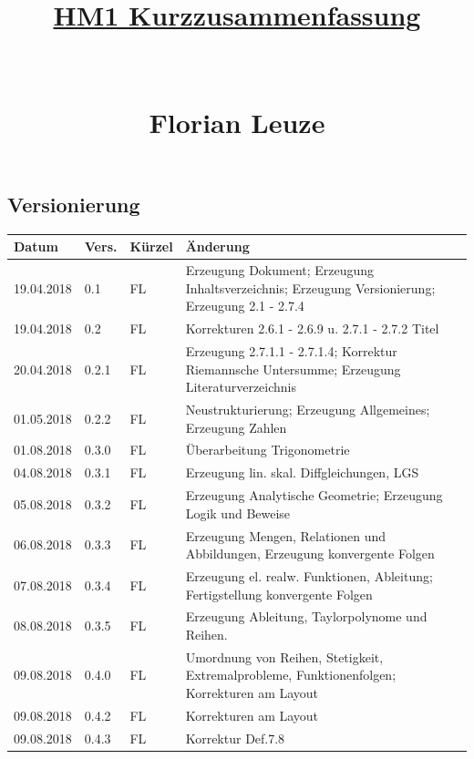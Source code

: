 \documentclass[12pt,a4paper]{article}%
\numberwithin{equation}{section}
\numberwithin{equation}{subsection}
\begin{document}


\author{}
\title{\underline{HM1 Kurzzusammenfassung} \\ $\;$ \\ $\;$ \\ Florian Leuze}
\date{}

\maketitle %
\newpage

\tableofcontents

  \subsection*{Versionierung}
  \begin{tabular}{|p{2cm}|p{1cm}|p{1.5cm}|p{8.5cm}|}\hline
    Datum & Vers. & Kürzel & Änderung \\ \hline
    19.04.2018 & 0.1 & FL & Erzeugung Dokument; Erzeugung Inhaltsverzeichnis; Erzeugung Versionierung; Erzeugung 2.1 - 2.7.4 \\ \hline
    19.04.2018 & 0.2 & FL & Korrekturen 2.6.1 - 2.6.9 u. 2.7.1 - 2.7.2 Titel\\ \hline
    20.04.2018 & 0.2.1 & FL & Erzeugung 2.7.1.1 - 2.7.1.4; Korrektur Riemannsche Untersumme; Erzeugung Literaturverzeichnis \\ \hline
    01.05.2018 & 0.2.2 & FL & Neustrukturierung; Erzeugung Allgemeines; Erzeugung Zahlen \\ \hline
    01.08.2018 & 0.3.0 & FL & Überarbeitung Trigonometrie \\ \hline
    04.08.2018 & 0.3.1 & FL & Erzeugung lin. skal. Diffgleichungen, LGS \\ \hline
    05.08.2018 & 0.3.2 & FL & Erzeugung Analytische Geometrie; Erzeugung Logik und Beweise \\ \hline
    06.08.2018 & 0.3.3 & FL & Erzeugung Mengen, Relationen und Abbildungen, Erzeugung konvergente Folgen \\ \hline
    07.08.2018 & 0.3.4 & FL & Erzeugung el. realw. Funktionen, Ableitung; Fertigstellung konvergente Folgen \\ \hline
    08.08.2018 & 0.3.5 & FL & Erzeugung Ableitung, Taylorpolynome und Reihen. \\ \hline
    09.08.2018 & 0.4.0 & FL & Umordnung von Reihen, Stetigkeit, Extremalprobleme, Funktionenfolgen; Korrekturen am Layout \\ \hline
    09.08.2018 & 0.4.2 & FL & Korrekturen am Layout \\ \hline
    09.08.2018 & 0.4.3 & FL & Korrektur Def.7.8 \\ \hline
  \end{tabular}
\newpage
\listoffigures
\end{document}
